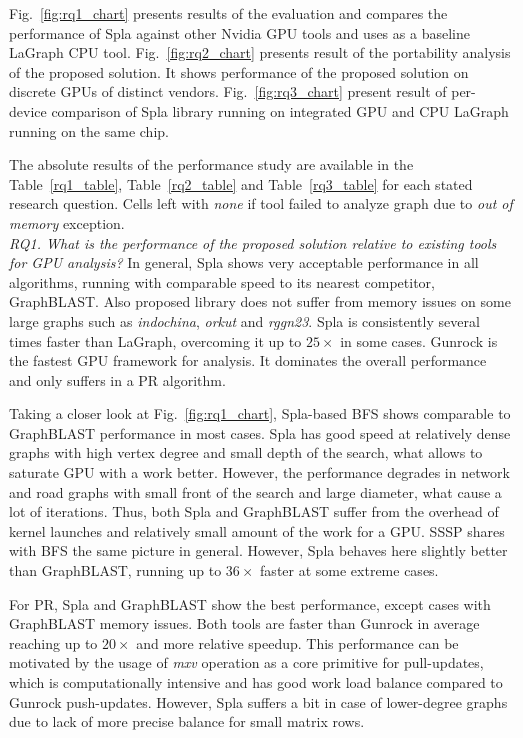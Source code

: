 Fig.~\ref{fig:rq1_chart} presents results of the evaluation and compares the performance of Spla against other Nvidia GPU tools and uses as a baseline LaGraph CPU tool. 
Fig.~\ref{fig:rq2_chart} presents result of the portability analysis of the proposed solution. It shows performance of the proposed solution on discrete GPUs of distinct vendors.
Fig.~\ref{fig:rq3_chart} present result of per-device comparison of Spla library running on integrated GPU and CPU LaGraph running on the same chip. 

The absolute results of the performance study are available in the Table~\ref{rq1_table}, Table~\ref{rq2_table} and Table~\ref{rq3_table} for each stated research question. Cells left with \textit{none} if tool failed to analyze graph due to \textit{out of memory} exception.\\

\textit{RQ1. What is the performance of the proposed solution relative to existing tools for GPU analysis?} In general, Spla shows very acceptable performance in all algorithms, running with comparable speed to its nearest competitor, GraphBLAST. Also proposed library does not suffer from memory issues on some large graphs such as \textit{indochina}, \textit{orkut} and \textit{rggn23}. Spla is consistently several times faster than LaGraph, overcoming it up to $25\times$ in some cases. Gunrock is the fastest GPU framework for analysis. It dominates the overall performance and only suffers in a PR algorithm.

Taking a closer look at Fig.~\ref{fig:rq1_chart}, Spla-based BFS shows comparable to GraphBLAST performance in most cases. Spla has good speed at relatively dense graphs with high vertex degree and small depth of the search, what allows to saturate GPU with a work better. However, the performance degrades in network and road graphs with small front of the search and large diameter, what cause a lot of iterations. Thus, both Spla and GraphBLAST suffer from the overhead of kernel launches and relatively small amount of the work for a GPU. SSSP shares with BFS the same picture in general. However, Spla behaves here slightly better than GraphBLAST, running up to $36\times$ faster at some extreme cases.

For PR, Spla and GraphBLAST show the best performance, except cases with GraphBLAST memory issues. Both tools are faster than Gunrock in average reaching up to $20\times$ and more relative speedup. This performance can be motivated by the usage of \textit{mxv} operation as a core primitive for pull-updates, which is computationally intensive and has good work load balance compared to Gunrock push-updates. However, Spla suffers a bit in case of lower-degree graphs due to lack of more precise balance for small matrix rows.

